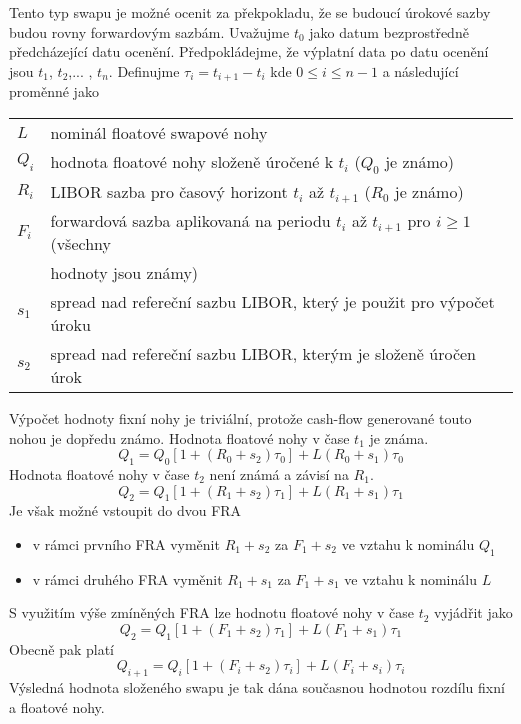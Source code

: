 \documentclass[a4paper]{book}
\begin{document}
Tento typ swapu je možné ocenit za překpokladu, že se budoucí úrokové sazby budou rovny forwardovým sazbám. Uvažujme $t_0$ jako datum bezprostředně předcházející datu ocenění. Předpokládejme, že výplatní data po datu ocenění jsou $t_1$, $t_2$,... , $t_n$. Definujme $\tau_i = t_{i+1} - t_i$ kde $0 \le i \le n - 1$ a následující proměnné jako

\begin{center}
\begin{tabular}{l l}
$L$ & nominál floatové swapové nohy\\
$Q_i$ & hodnota floatové nohy složeně úročené k $t_i$ ($Q_0$ je známo)\\
$R_i$ & LIBOR sazba pro časový horizont $t_i$ až $t_{i+1}$ ($R_0$ je známo)\\
$F_i$ & forwardová sazba aplikovaná na periodu $t_i$ až $t_{i+1}$ pro $i \ge 1$ (všechny\\
$ $ & hodnoty jsou známy)\\
$s_1$ & spread nad refereční sazbu LIBOR, který je použit pro výpočet úroku\\
$s_2$ & spread nad refereční sazbu LIBOR, kterým je složeně úročen úrok\\
\end{tabular}
\end{center}
Výpočet hodnoty fixní nohy je triviální, protože cash-flow generované touto nohou je dopředu známo. Hodnota floatové nohy v čase $t_1$ je známa.
\begin{equation*}
Q_1 = Q_0[1+(R_0 + s_2)\tau_0]+L(R_0 + s_1)\tau_0
\end{equation*}
Hodnota floatové nohy v čase $t_2$ není známá a závisí na $R_1$.
\begin{equation*}
Q_2 = Q_1[1 + (R_1 + s_2)\tau_1]+L(R_1 + s_1)\tau_1
\end{equation*}
Je však možné vstoupit do dvou FRA
\begin{itemize}
\item v rámci prvního FRA vyměnit $R_1 + s_2$ za $F_1 + s_2$ ve vztahu k nominálu $Q_1$
\item v rámci druhého FRA vyměnit $R_1 + s_1$ za $F_1 + s_1$ ve vztahu k nominálu $L$
\end{itemize}
S využitím výše zmíněných FRA lze hodnotu floatové nohy v čase $t_2$ vyjádřit jako
\begin{equation*}
Q_2 = Q_1[1+(F_1 + s_2)\tau_1]+L(F_1 + s_1)\tau_1
\end{equation*}
Obecně pak platí
\begin{equation*}
Q_{i+1} = Q_i[1+(F_i + s_2)\tau_i] + L(F_i + s_i)\tau_i
\end{equation*}
Výsledná hodnota složeného swapu je tak dána současnou hodnotou rozdílu fixní a floatové nohy.
\end{document}
